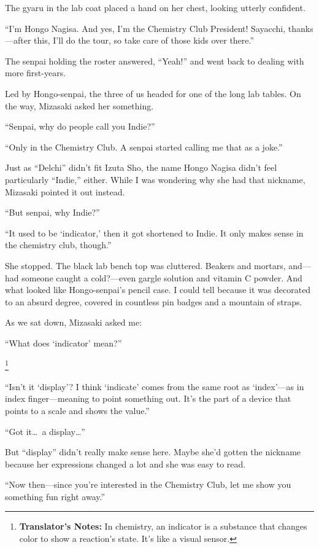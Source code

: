\documentclass[
    a4paper,
    12pt,
    twoside,
    openany,
    UTF8,
    fontset=windows
]{ctexbook}
\begin{document}
The gyaru in the lab coat placed a hand on her chest, looking utterly confident.

``I'm Hongo Nagisa. And yes, I'm the Chemistry Club President! Sayacchi, thanks---after this, I'll do the tour, so take care of those kids over there.''

The senpai holding the roster answered, ``Yeah!'' and went back to dealing with more first-years.

Led by Hongo-senpai, the three of us headed for one of the long lab tables. On the way, Mizasaki asked her something.

``Senpai, why do people call you Indie?''

``Only in the Chemistry Club. A senpai started calling me that as a joke.''

Just as ``Delchi'' didn't fit Izuta Sho, the name Hongo Nagisa didn't feel particularly ``Indie,'' either. While I was wondering why she had that nickname, Mizasaki pointed it out instead.

``But senpai, why Indie?''

``It used to be `indicator,' then it got shortened to Indie. It only makes sense in the chemistry club, though.''

She stopped. The black lab bench top was cluttered. Beakers and mortars, and---had someone caught a cold?---even gargle solution and vitamin C powder. And what looked like Hongo-senpai's pencil case. I could tell because it was decorated to an absurd degree, covered in countless pin badges and a mountain of straps.

As we sat down, Mizasaki asked me:

``What does `indicator' mean?''

\footnote{\textbf{Translator's Notes:} In chemistry, an indicator is a substance that changes color to show a reaction's state. It's like a visual sensor.}

``Isn't it `display'? I think `indicate' comes from the same root as `index'---as in index finger---meaning to point something out. It's the part of a device that points to a scale and shows the value.''

``Got it\dots\ a display\dots''

But ``display'' didn't really make sense here. Maybe she'd gotten the nickname because her expressions changed a lot and she was easy to read.

``Now then---since you're interested in the Chemistry Club, let me show you something fun right away.''
\end{document}

